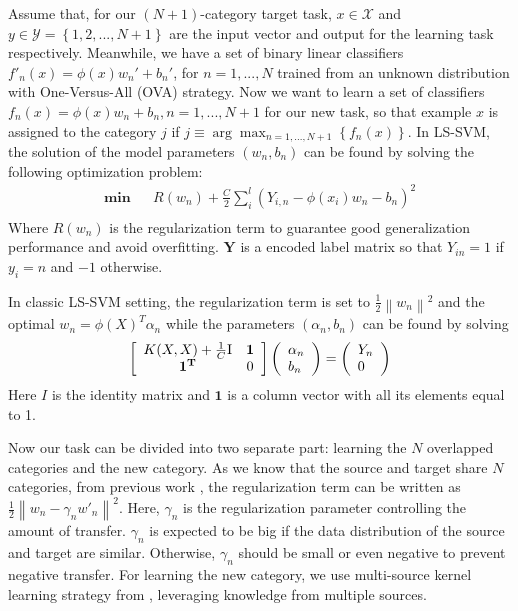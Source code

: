  

Assume that, for our $(N+1)$-category target task, ${x} \in \mathcal{X}$ and ${y} \in \mathcal{Y}=\left\{1,2,...,N+1\right\}$ are the input vector and output for the learning task respectively. Meanwhile, we have a set of binary linear classifiers $f'_n(x)=\phi(x)w_n'+b_n'$, for $n=1,...,N$ trained from an unknown distribution with One-Versus-All (OVA) strategy.  Now we want to learn a set of classifiers $f_n(x)=\phi(x)w_n+b_n, n=1,...,N+1$ for our new task, so that example $x$ is assigned to the category $j$ if $j \equiv \arg {\max _{n = 1,...,N+1}}\left\{{f_n}(x)\right\}$. In LS-SVM, the solution of the model parameters $(w_n,b_n)$ can be found by solving the following optimization problem:
\begin{equation*}
\begin{aligned}
\textbf{min} && R({w_n}) + \frac{C}{2}\sum\limits_i^l {({Y_{i,n}} - \phi ({x_i}){w_n} - {b_n})^2} \\
\end{aligned}
\end{equation*}
Where $R({w_n})$ is the regularization term to guarantee good generalization performance and avoid overfitting. $\mathbf{Y}$ is a encoded label matrix so that $Y_{in}=1$ if $y_i=n$ and $-1$ otherwise.  

In classic LS-SVM setting, the regularization term is set to $\frac{1}{2}\left\|w_n\right\|^2$ and the optimal $w_n=\phi(X)^T\alpha_n$ while the parameters $(\alpha_n,b_n)$ can be found by solving
\begin{equation}\label{eq:linear}
\left[ {\begin{array}{*{20}{c}}
{K(X,X) + \frac{1}{C}{\rm{I}}}&\mathbf{1}\\
\mathbf{1^T}&0
\end{array}} \right]\left( \begin{array}{l}
{\alpha _n}\\
{b_n}
\end{array} \right) = \left( \begin{array}{l}
{Y_n}\\
0
\end{array} \right)  
\end{equation}
Here $I$ is the identity matrix and $\mathbf{1}$ is a column vector with all its elements equal to 1.

Now our task can be divided into two separate part: learning the $N$ overlapped categories and the new category. 
As we know that the source and target share $N$ categories, from previous work \cite{yang2007cross}, the regularization term can be written as $\frac{1}{2}{{{\left\| {{w_n} - {\gamma _n}{{w'}_n}} \right\|}^2}}$. Here, $\gamma_n$ is the regularization parameter controlling the amount of transfer. $\gamma_n$ is expected to be big if the data distribution of the source and target are similar. Otherwise, $\gamma_n$ should be small or even negative to prevent negative transfer.  
For learning the new category, we use multi-source kernel learning strategy from \cite{tommasi2014learning}, leveraging knowledge from multiple sources.  

